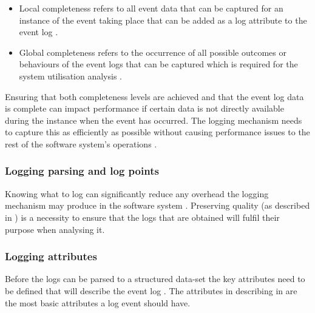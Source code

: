 \begin{itemize}
	\item Local completeness refers to all event data that can be captured for an instance of the event taking place that can be added as a log attribute to the event log \cite{Kherbouche2017, VanDerAalst2004}.
	\item Global completeness refers to the occurrence of all possible outcomes or behaviours of the event logs that can be captured which is required for the system utilisation analysis \cite{Kherbouche2017, VanDerAalst2004}.
\end{itemize}

Ensuring that both completeness levels are achieved and that the event log data is complete can impact performance if certain data is not directly available during the instance when the event has occurred. The logging mechanism needs to capture this as efficiently as possible without causing performance issues to the rest of the software system's operations \cite{Zhu2015, Zhu2019}. 

\subsubsection{Logging parsing and log points}\label{sec:ch1_loggignPoints}
Knowing what to log can significantly reduce any overhead the logging mechanism may produce in the software system \cite{Jia2018, Pecchia2015}. Preserving quality (as described in ) is a necessity to ensure that the logs that are obtained will fulfil their purpose when analysing it.

\subsubsection{Logging attributes}
Before the logs can be parsed to a structured data-set the key attributes need to be defined that will describe the event log \cite{Bekeneva2020}. The attributes in describing in  are the most basic attributes a log event should have. 


